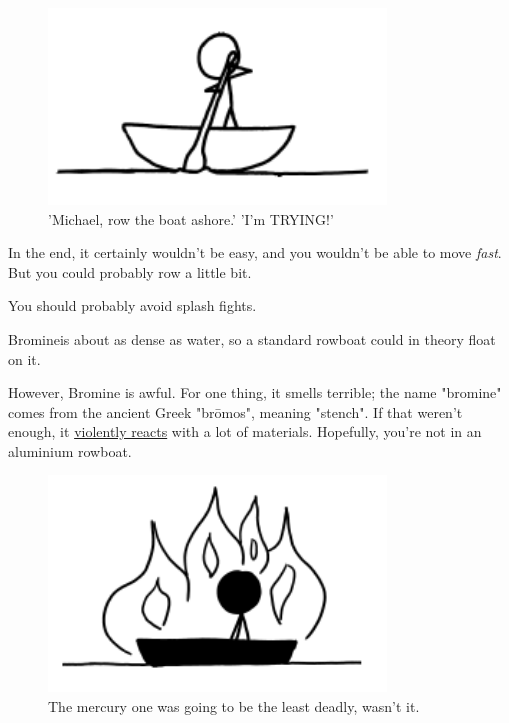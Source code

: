 {\begin{figure}[!htbp]
\centering
\includegraphics[scale=0.5, max width=0.8\textwidth]{imgs/a/50/boat_mercury.png}
\caption{'Michael, row the boat ashore.' 'I'm TRYING!'}
\end{figure}

{In the end, it certainly wouldn't be easy, and you wouldn't be able to move \emph{fast}. But you could probably row a little bit.}

{You should probably avoid splash fights.}

{Bromineis about as dense as water, so a standard rowboat could in theory float on it.}

{However, Bromine is awful. For one thing, it smells terrible; the name "bromine" comes from the ancient Greek "brōmos", meaning "stench". If that weren't enough, it \href{http://www.youtube.com/watch?v=uCwHzTsx5yY}{violently reacts} with a lot of materials. Hopefully, you're not in an aluminium rowboat.}

\begin{figure}[!htbp]
\centering
\includegraphics[scale=0.5, max width=0.8\textwidth]{imgs/a/50/boat_bromine_aluminium.png}
\caption{The mercury one was going to be the least deadly, wasn't it.}
\end{figure}

}
